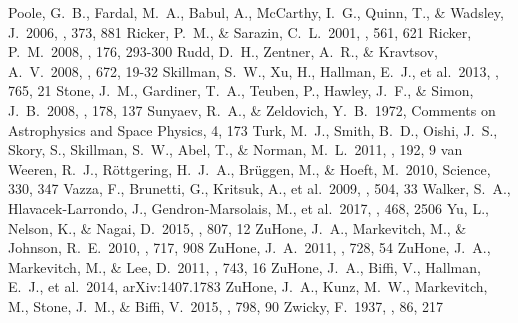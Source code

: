 \documentclass{emulateapj}
\begin{document}
\begin{thebibliography}{}
 Poole, G.~B., Fardal, M.~A., Babul, A., McCarthy, I.~G., Quinn, T., \& Wadsley, J.\ 2006, \mnras, 373, 881
 Ricker, P.~M., \& Sarazin, C.~L.\ 2001, \apj, 561, 621
 Ricker, P.~M.\ 2008, \apjs, 176, 293-300
 Rudd, D.~H., Zentner, A.~R., \& Kravtsov, A.~V.\ 2008, \apj, 672, 19-32 
 Skillman, S.~W., Xu, H., Hallman, E.~J., et al.\ 2013, \apj, 765, 21
 Stone, J.~M., Gardiner, T.~A., Teuben, P., Hawley, J.~F., \& Simon, J.~B.\ 2008, \apjs, 178, 137
 Sunyaev, R.~A., \& Zeldovich, Y.~B.\ 1972, Comments on Astrophysics and Space Physics, 4, 173
 Turk, M.~J., Smith, B.~D., Oishi, J.~S., Skory, S., Skillman, S.~W., Abel, T., \& Norman, M.~L.\ 2011, \apjs, 192, 9
 van Weeren, R.~J., R{\"o}ttgering, H.~J.~A., Br{\"u}ggen, M., \& Hoeft, M.\ 2010, Science, 330, 347
 Vazza, F., Brunetti, G., Kritsuk, A., et al.\ 2009, \aap, 504, 33
 Walker, S.~A., Hlavacek-Larrondo, J., Gendron-Marsolais, M., et al.\ 2017, \mnras, 468, 2506 
 Yu, L., Nelson, K., \& Nagai, D.\ 2015, \apj, 807, 12
 ZuHone, J.~A., Markevitch, M., \& Johnson, R.~E.\ 2010, \apj, 717, 908
 ZuHone, J.~A.\ 2011, \apj, 728, 54
 ZuHone, J.~A., Markevitch, M., \& Lee, D.\ 2011, \apj, 743, 16
 ZuHone, J.~A., Biffi, V., Hallman, E.~J., et al.\ 2014, arXiv:1407.1783
 ZuHone, J.~A., Kunz, M.~W., Markevitch, M., Stone, J.~M., \& Biffi, V.\ 2015, \apj, 798, 90
 Zwicky, F.\ 1937, \apj, 86, 217
\end{thebibliography}{}
\end{document}
